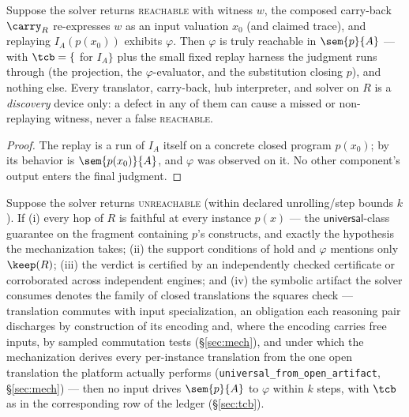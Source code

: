 \begin{theorem}
\label{thm:existential}
Suppose the solver returns \textsc{reachable} with witness $w$, the
composed carry-back $\carry_R$ re-expresses $w$ as an input valuation
$x_0$ (and claimed trace), and replaying $I_A(p(x_0))$ exhibits
$\varphi$. Then $\varphi$ is truly reachable in $\sem{p}{A}$ --- with
$\tcb = \{$ for $I_A\}$ plus the small fixed replay
harness the judgment runs through (the projection, the
$\varphi$-evaluator, and the substitution closing $p$), and nothing
else. Every
translator, carry-back, hub interpreter, and solver on $R$ is a
\emph{discovery} device only: a defect in any of them can cause a missed
or non-replaying witness, never a false \textsc{reachable}.
\end{theorem}

\begin{proof}
The replay is a run of $I_A$ itself on a concrete closed program
$p(x_0)$; by  its behavior is $\sem{p(x_0)}{A}$, and
$\varphi$ was observed on it. No other component's output enters the
final judgment.
\end{proof}

\begin{theorem}
\label{thm:universal}
Suppose the solver returns \textsc{unreachable} (within declared
unrolling/step bounds $k$). If (i) every hop of $R$ is faithful at every
instance $p(x)$ --- the $\mathsf{universal}$-class guarantee on the
fragment containing $p$'s constructs, and exactly the hypothesis the
mechanization takes; (ii) the support conditions of
 hold and $\varphi$ mentions only $\keep(R)$;
(iii) the verdict is certified by an independently checked certificate
or corroborated across independent engines; and (iv) the symbolic
artifact the solver consumes denotes the family of closed translations
the squares check --- translation commutes with input specialization, an
obligation each reasoning pair discharges by construction of its
encoding and, where the encoding carries free inputs, by sampled
commutation tests (\S\ref{sec:mech}), and under which the mechanization
derives every
per-instance translation from the one open translation the platform
actually performs (\texttt{universal\_from\_open\_artifact},
\S\ref{sec:mech}) --- then no input drives
$\sem{p}{A}$ to $\varphi$ within $k$ steps, with $\tcb$ as in the
corresponding row of the ledger (\S\ref{sec:tcb}).
\end{theorem}

